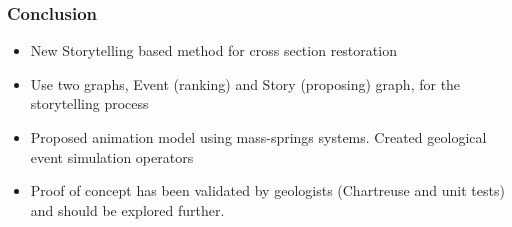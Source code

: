 \documentclass{beamer}
\begin{document}
	\begin{frame}
	\frametitle{Conclusion}
	\begin{itemize}
	\item New Storytelling based method for cross section restoration
	\item Use two graphs, Event (ranking) and Story (proposing) graph, for the storytelling process
	\item Proposed animation model using mass-springs systems. Created geological event simulation operators
	\item Proof of concept has been validated by geologists (Chartreuse and unit tests) and should be explored further.
	\end{itemize}
	\end{frame}
	

	
\end{document}
